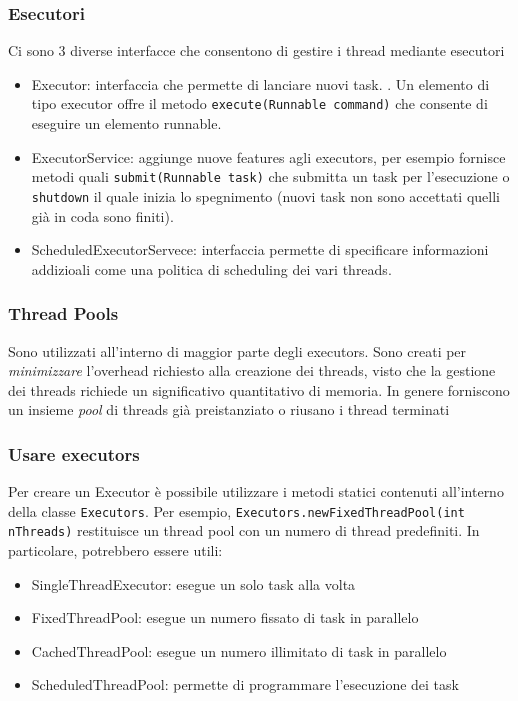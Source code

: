 \documentclass{beamer}
\begin{document}
\begin{frame}
\frametitle{Esecutori}
Ci sono 3 diverse interfacce che consentono di gestire i thread mediante esecutori
\begin{itemize}
\item Executor: interfaccia che permette di lanciare nuovi task. . Un elemento di tipo executor offre il metodo \texttt{execute(Runnable command)} che consente di eseguire un elemento runnable. 
\item ExecutorService: aggiunge nuove features agli executors, per esempio fornisce metodi quali \texttt{submit(Runnable task)} che submitta un task per l'esecuzione o \texttt{shutdown} il quale inizia lo spegnimento (nuovi task non sono accettati quelli gi\`a in coda sono finiti).
\item ScheduledExecutorServece: interfaccia permette di specificare informazioni addizioali come una politica di scheduling dei vari threads.
\end{itemize}
\end{frame}

\begin{frame}
\frametitle{Thread Pools}
Sono utilizzati all'interno di maggior parte degli executors. Sono creati per \emph{minimizzare} l'overhead richiesto alla creazione dei threads, visto che la gestione dei threads richiede un significativo quantitativo di memoria. In genere forniscono un insieme \emph{pool} di threads gi\`a preistanziato o riusano i thread terminati
\end{frame}

\begin{frame}
\frametitle{Usare executors}
Per creare un Executor \`e possibile utilizzare i metodi statici contenuti all'interno della classe \texttt{Executors}. Per esempio, \texttt{Executors.newFixedThreadPool(int nThreads)} restituisce un thread pool con un numero di thread predefiniti. In particolare, potrebbero essere utili:
\begin{itemize}
\item SingleThreadExecutor: esegue un solo task alla volta
\item FixedThreadPool: esegue un numero fissato di task in parallelo
\item CachedThreadPool: esegue un numero illimitato di task in parallelo
\item ScheduledThreadPool: permette di programmare l’esecuzione dei task
\end{itemize}
\end{frame}
\end{document}
